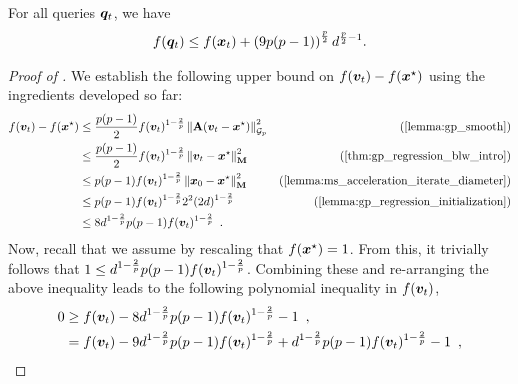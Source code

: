 \begin{lemma}
\label{lemma:fq_bounded}
For all queries $\bm{q}_t$, we have
\begin{align*}
    f(\bm{q}_t) \le f(\bm{x}_t) + \left(9p(p-1)\right)^{\frac{p}{2}}d^{\frac{p}{2}-1}.
\end{align*}
\end{lemma}
\begin{proof}[Proof of ]
We establish the following upper bound on $f(\bm{v}_t) - f(\bm{x}^{\star})$ using the ingredients developed so far:
\begin{align*}
    f(\vv_t) - f(\xstar) &\le \frac{p(p-1)}{2}f(\vv_t)^{1-\frac{2}{p}}\gnorm{\mA(\vv_t-\xstar)}{p}^2 & \text{(\Cref{lemma:gp_smooth})} \\
    &\le \frac{p(p-1)}{2}f(\vv_t)^{1-\frac{2}{p}}\norm{\vv_t-\xstar}_{\mM}^2 & \text{(\Cref{thm:gp_regression_blw_intro})} \\
    &\le p(p-1)f(\vv_t)^{1-\frac{2}{p}}\norm{\vx_0-\xstar}_{\mM}^2 & \text{(\Cref{lemma:ms_acceleration_iterate_diameter})}\\
    &\le p(p-1)f(\vv_t)^{1-\frac{2}{p}}2^2(2d)^{1-\frac{2}{p}} & \text{(\Cref{lemma:gp_regression_initialization})} \\
    &\leq 8d^{1-\frac{2}{p}}p(p-1)f(\vv_t)^{1-\frac{2}{p}}\enspace.
\end{align*}
Now, recall that we assume by rescaling that $f(\bm{x}^{\star})=1$. From this, it trivially follows that $1 \le d^{1-\frac{2}{p}}p(p-1)f(\bm{v}_t)^{1-\frac{2}{p}}$. Combining these and re-arranging the above inequality leads to the following  polynomial inequality in $f(\bm{v}_t)$,
\begin{align}
    0 &\ge f(\vv_t)-8d^{1-\frac{2}{p}}p(p-1)f(\vv_t)^{1-\frac{2}{p}} -1\enspace,\nonumber\\ 
    &= f(\vv_t)-9d^{1-\frac{2}{p}}p(p-1)f(\vv_t)^{1-\frac{2}{p}} +  d^{1-\frac{2}{p}}p(p-1)f(\vv_t)^{1-\frac{2}{p}} -1\enspace,\nonumber\\

\end{align}
\end{proof}
